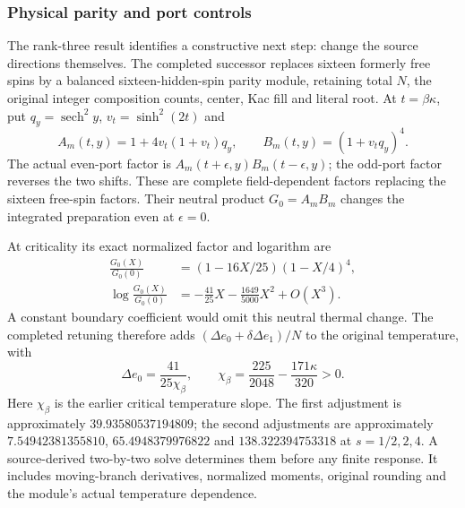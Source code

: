 \subsubsection{Physical parity and port controls}

The rank-three result identifies a constructive next step: change the source directions themselves. The completed successor replaces sixteen formerly free spins by a balanced sixteen-hidden-spin parity module, retaining total $N$, the original integer composition counts, center, Kac fill and literal root. At $t=\beta\kappa$, put $q_y=\operatorname{sech}^2y$, $v_t=\sinh^2(2t)$ and
\begin{equation}
 A_m(t,y)=1+4v_t(1+v_t)q_y,\qquad
 B_m(t,y)=(1+v_tq_y)^4.
\end{equation}
The actual even-port factor is $A_m(t+\epsilon,y)B_m(t-\epsilon,y)$; the odd-port factor reverses the two shifts. These are complete field-dependent factors replacing the sixteen free-spin factors. Their neutral product $G_0=A_mB_m$ changes the integrated preparation even at $\epsilon=0$.

At criticality its exact normalized factor and logarithm are
\begin{align}
 \frac{G_0(X)}{G_0(0)}
 &=(1-16X/25)(1-X/4)^4,\\
 \log\frac{G_0(X)}{G_0(0)}
 &=-\frac{41}{25}X-\frac{1649}{5000}X^2+O(X^3).
\end{align}
A constant boundary coefficient would omit this neutral thermal change. The completed retuning therefore adds $(\Delta e_0+\delta\Delta e_1)/N$ to the original temperature, with
\begin{equation}
 \Delta e_0=\frac{41}{25\chi_\beta},\qquad
 \chi_\beta=\frac{225}{2048}-\frac{171\kappa}{320}>0.
\end{equation}
Here $\chi_\beta$ is the earlier critical temperature slope. The first adjustment is approximately $39.93580537194809$; the second adjustments are approximately $7.54942381355810$, $65.4948379976822$ and $138.322394753318$ at $s=1/2,2,4$. A source-derived two-by-two solve determines them before any finite response. It includes moving-branch derivatives, normalized moments, original rounding and the module's actual temperature dependence.

